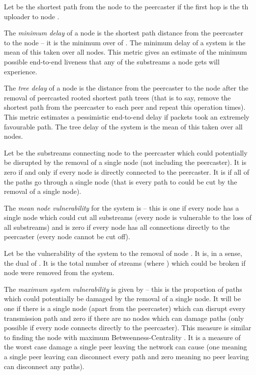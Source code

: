 Let  be the shortest path from the node  to the peercaster if the
first hop is the th uploader to node .

\begin{definition}
The {\em minimum delay\/} of a node is the shortest path distance from the 
peercaster to the node -- it is the minimum over  of .  
The minimum delay of a system is the mean of this 
taken over all nodes.  This metric gives an estimate of the minimum possible
end-to-end liveness that any of the substreams a node gets will experience.
\end{definition}

\begin{definition}
The {\em tree delay\/} of a node is the distance from the peercaster to
the node after the removal of  peercasted rooted shortest
path trees (that is to say,
remove the shortest path from the peercaster to each peer and repeat
this operation  times).  This metric
estimates a pessimistic end-to-end delay if packets took an extremely
favourable path.
The tree delay of the system is the mean of this taken over all nodes.
\end{definition}

Let  be
the substreams connecting node  to the peercaster which could potentially 
be disrupted by the removal of a single node (not including the
peercaster).  It is zero if and only if every node 
is directly connected to the peercaster.  It is  if all of the paths
 go through a single node (that is every path to  could be
cut by the removal of a single node).

\begin{definition}
The {\em mean node vulnerability\/} for the
system is  -- this
is one if every node has a single node which could cut all  substreams 
(every node is vulnerable to the loss of all substreams) and
is zero if every node has all connections directly to the peercaster
(every node cannot be cut off).
\end{definition}

Let  be the vulnerability of the system to the removal of node .
It is, in a sense, the dual of .  It is the total number of streams
 (where ) which could be broken if node  were
removed from the system.

\begin{definition}
The {\em maximum system vulnerability\/} is
given by  -- 
this is the proportion of paths which could potentially be damaged by the 
removal of a
single node.  It will be one if there is a single node (apart from the peercaster)
which can disrupt every transmission path and zero if there are no nodes which
can damage paths (only possible if every node connects directly to the peercaster).
This measure is similar to finding the node with maximum
Betweenness-Centrality \cite{betweenness}.  It is a measure of the worst case
damage a single peer leaving the network can cause (one meaning a single peer leaving
can disconnect every path and zero meaning no peer leaving can disconnect any paths).
\end{definition}


